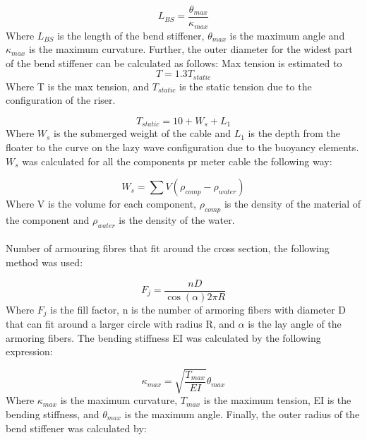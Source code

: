 \begin{equation}
   L_{BS} = \frac{\theta_{max}}{\kappa_{max}} 
  \end{equation}
Where $L_{BS}$ is the length of the bend stiffener, $\theta_{max}$ is the maximum angle and $\kappa_{max}$ is the maximum curvature. \newline
\newline
Further, the outer diameter for the widest part of the bend stiffener can be calculated as follows: \newline
\newline 
Max tension is estimated to 
\begin{equation}
   T = 1.3  T_{static}
\end{equation}
Where T is the max tension, and $T_{static}$ is the static tension due to the configuration of the riser.

\begin{equation}
   T_{static} = 10 + W_s + L_1
\end{equation}
Where $W_s$ is the submerged weight of the cable and $L_1$ is the depth from the floater to the curve on the lazy wave configuration due to the buoyancy elements.\newline
\newline
\noindent $W_s$ was calculated for all the components pr meter cable the following way:

\begin{equation}
   W_s = \sum V (\rho_{comp}-\rho_{water})
\end{equation}
 Where V is the volume for each component, $\rho_{comp}$ is the density of the material of the component and $\rho_{water}$ is the density of the water.\\\\ Number of armouring fibres that fit around the cross section, the following method was used: 

 \begin{equation}
   F_j=\frac{n D}{\cos{(\alpha)} 2 \pi R}
\end{equation}
Where $F_j$ is the fill factor, n is the number of armoring fibers with diameter D  that can fit around a larger circle with radius R, and $\alpha$ is the lay angle of the armoring fibers.  \newline
\newline 
The bending stiffness EI was calculated by the following expression:

 \begin{equation}
   \kappa_{max} = \sqrt{\frac{T_{max}}{EI}}\theta_{max}
\end{equation}
Where $\kappa_{max}$ is the maximum curvature, $T_{max}$ is the maximum tension, EI is the bending stiffness, and $\theta_{max}$ is the maximum angle.\newline  
\newline 
\noindent Finally, the outer radius of the bend stiffener was calculated by:

